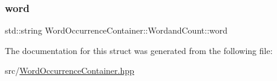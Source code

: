 \mbox{\label{struct_word_occurrence_container_1_1_wordand_count_a7350d13d7a0942fb29f92826e6133252}} 
\subsubsection{\texorpdfstring{word}{word}}
{\footnotesize\ttfamily std\+::string Word\+Occurrence\+Container\+::\+Wordand\+Count\+::word}



The documentation for this struct was generated from the following file\+:\begin{DoxyCompactItemize}
\item 
src/\mbox{\hyperlink{_word_occurrence_container_8hpp}{Word\+Occurrence\+Container.\+hpp}}\end{DoxyCompactItemize}
